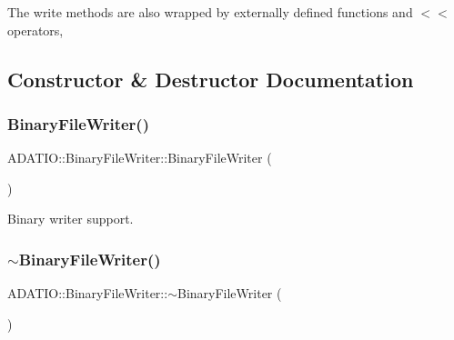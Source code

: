 The write methods are also wrapped by externally defined functions and $<$$<$ operators, 

\subsection{Constructor \& Destructor Documentation}
\mbox{\label{classADATIO_1_1BinaryFileWriter_aa0579bad52db7809ed5d30b964aa3443}} 
\subsubsection{\texorpdfstring{BinaryFileWriter()}{BinaryFileWriter()}\hspace{0.1cm}{\footnotesize\ttfamily [1/4]}}
{\footnotesize\ttfamily A\+D\+A\+T\+I\+O\+::\+Binary\+File\+Writer\+::\+Binary\+File\+Writer (\begin{DoxyParamCaption}{ }\end{DoxyParamCaption})}



Binary writer support. 

\mbox{\label{classADATIO_1_1BinaryFileWriter_ae74f92826c49450ba710f22300718ada}} 
\subsubsection{\texorpdfstring{$\sim$BinaryFileWriter()}{~BinaryFileWriter()}\hspace{0.1cm}{\footnotesize\ttfamily [1/2]}}
{\footnotesize\ttfamily A\+D\+A\+T\+I\+O\+::\+Binary\+File\+Writer\+::$\sim$\+Binary\+File\+Writer (\begin{DoxyParamCaption}{ }\end{DoxyParamCaption})}

